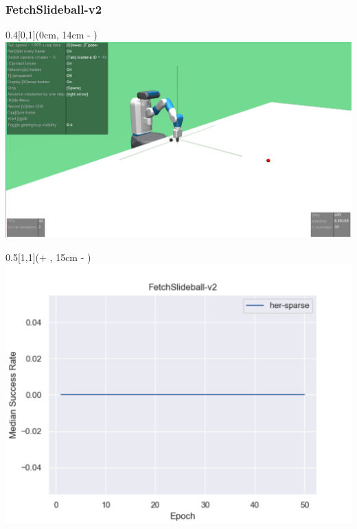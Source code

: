 


\begin{frame}
	\frametitle{FetchSlideball-v2}	
	\vspace{1cm}
	
	\begin{textblock*}{0.4\paperwidth}[0,1](0cm, 14cm - \PraesentationSeitenrand)%
		\includegraphics[width=0.4\paperwidth]{./Ressourcen/Figures/FetchSlideball-v2.pdf}
	\end{textblock*}
	
	\begin{textblock*}{0.5\paperwidth}[1,1](\textwidth + \PraesentationSeitenrand, 15cm - \PraesentationSeitenrand)%
		\includegraphics[width=0.5\paperwidth]{./Ressourcen/Figures/fig_FetchSlideball-v2.pdf}
	\end{textblock*}
	
\end{frame}
\clearpage


